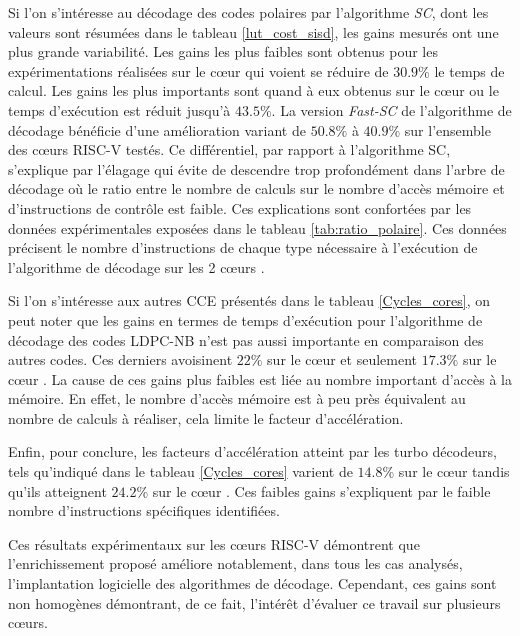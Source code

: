 \documentclass[../main.tex]{subfiles}
\begin{document}
Si l'on s'intéresse au décodage des codes polaires par l'algorithme \textit{SC}, dont les valeurs sont résumées dans le tableau \ref{lut_cost_sisd}, les gains mesurés ont une plus grande variabilité. Les gains les plus faibles sont obtenus pour les expérimentations réalisées sur le cœur \SCR\space qui voient se réduire de $30.9\%$ le temps de calcul. Les gains les plus importants sont quand à eux obtenus sur le cœur \PicoRV\space ou le temps d'exécution est réduit jusqu'à $43.5\%$. La version \textit{Fast-SC} de l'algorithme de décodage bénéficie d'une amélioration variant de $50.8\%$ à $40.9\%$ sur l'ensemble des cœurs RISC-V testés. Ce différentiel, par rapport à l'algorithme SC, s'explique par l'élagage qui évite de descendre trop profondément dans l'arbre de décodage où le ratio entre le nombre de calculs sur le nombre d'accès mémoire et d'instructions de contrôle est faible. Ces explications sont confortées par les données expérimentales exposées dans le tableau \ref{tab:ratio_polaire}. Ces données précisent le nombre d'instructions de chaque type nécessaire à l'exécution de l'algorithme de décodage sur les 2 cœurs \PicoRV.

Si l'on s'intéresse aux autres CCE présentés dans le tableau \ref{Cycles_cores}, on peut noter que les gains en termes de temps d'exécution pour l'algorithme de décodage des codes LDPC-NB n'est pas aussi importante en comparaison des autres codes. Ces derniers avoisinent $22\%$ sur le cœur \IBEX\space et seulement $17.3\%$ sur le cœur \PicoRV. 
La cause de ces gains plus faibles est liée au nombre important d'accès à la mémoire. En effet, le nombre d'accès mémoire est à peu près équivalent au nombre de calculs à réaliser, cela limite le facteur d'accélération.

Enfin, pour conclure, les facteurs d'accélération atteint par les turbo décodeurs, tels qu'indiqué dans le tableau \ref{Cycles_cores} varient de $14.8\%$ sur le cœur \PicoRV\space tandis qu'ils atteignent $24.2\%$ sur le cœur \RISCY. Ces faibles gains s'expliquent par le faible nombre d'instructions spécifiques identifiées.

Ces résultats expérimentaux sur les cœurs RISC-V démontrent que l'enrichissement proposé améliore notablement, dans tous les cas analysés, l'implantation logicielle des algorithmes de décodage. Cependant, ces gains sont non homogènes démontrant, de ce fait, l'intérêt d'évaluer ce travail sur plusieurs cœurs.
\end{document}
